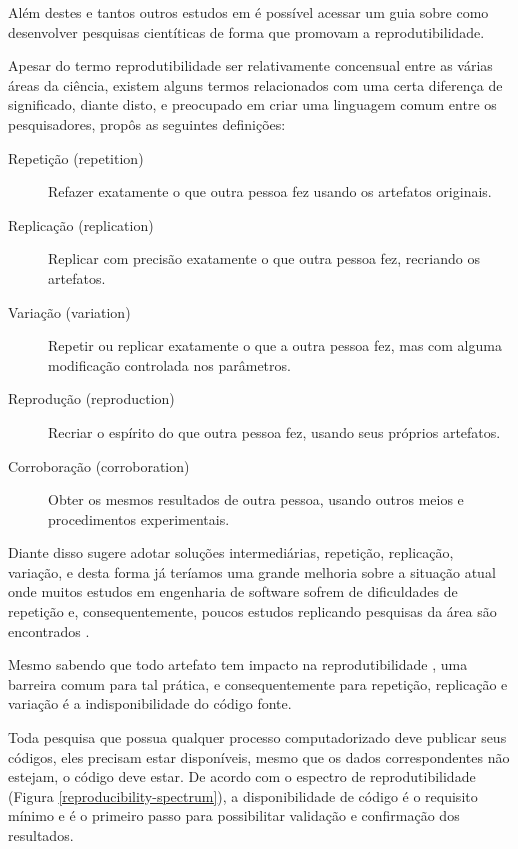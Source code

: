 Além destes e tantos outros estudos em
\cite{github2016reproducibility} é possível acessar um guia sobre como
desenvolver pesquisas cientíticas de forma que promovam a reprodutibilidade.

Apesar do termo reprodutibilidade ser relativamente concensual entre as várias
áreas da ciência, existem alguns termos relacionados com uma certa diferença
de significado, diante disto, e preocupado em criar uma linguagem comum entre
os pesquisadores,  propôs as seguintes definições:

\begin{description}

  \item[Repetição (repetition)]
  Refazer exatamente o que outra pessoa fez usando os artefatos originais.

  \item[Replicação (replication)]
  Replicar com precisão exatamente o que outra pessoa fez, recriando os
  artefatos.

  \item[Variação (variation)]
  Repetir ou replicar exatamente o que a outra pessoa fez, mas com alguma
  modificação controlada nos parâmetros.

  \item[Reprodução (reproduction)]
  Recriar o espírito do que outra pessoa fez, usando seus próprios artefatos.

  \item[Corroboração (corroboration)]
  Obter os mesmos resultados de outra pessoa, usando outros meios e
  procedimentos experimentais.

\end{description}

Diante disso  sugere adotar soluções
intermediárias, repetição, replicação, variação, e desta forma já teríamos uma
grande melhoria sobre a situação atual onde muitos estudos em engenharia de
software sofrem de dificuldades de repetição \cite{tang2016worthiness} e,
consequentemente, poucos estudos replicando pesquisas da área são encontrados
\cite{silva_replication_2011}.

Mesmo sabendo que todo artefato tem impacto na reprodutibilidade
\cite{gonzalez_reproducibility_2012}, uma barreira comum para tal prática, e
consequentemente para repetição, replicação e variação é a indisponibilidade do
código fonte.

Toda pesquisa que possua qualquer processo computadorizado deve
publicar seus códigos, eles precisam estar disponíveis, mesmo que os dados
correspondentes não estejam, o código deve estar. De acordo com o espectro de
reprodutibilidade (Figura \ref{reproducibility-spectrum}), a disponibilidade de
código é o requisito mínimo e é o primeiro passo para possibilitar validação e
confirmação dos resultados.

